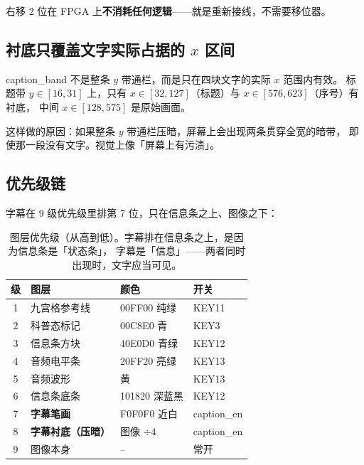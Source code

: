 \documentclass[10pt,a4paper]{article}
\newcommand{\sig}[1]{{\ttfamily\small #1}}
\newcommand{\code}[1]{{\ttfamily\small #1}}
\begin{document}
右移 2 位在 FPGA 上\textbf{不消耗任何逻辑}——就是重新接线，不需要移位器。

\subsection{\texorpdfstring{衬底只覆盖文字实际占据的 $x$ 区间}{衬底只覆盖文字实际占据的 x 区间}}

\code{caption\_band} 不是整条 $y$ 带通栏，而是只在四块文字的实际 $x$ 范围内有效。
标题带 $y\in[16,31]$ 上，只有 $x\in[32,127]$（标题）与 $x\in[576,623]$（序号）有衬底，
中间 $x\in[128,575]$ 是原始画面。

这样做的原因：如果整条 $y$ 带通栏压暗，屏幕上会出现两条贯穿全宽的暗带，
即使那一段没有文字。视觉上像「屏幕上有污渍」。

\subsection{优先级链}

字幕在 9 级优先级里排第 7 位，只在信息条之上、图像之下：

\begin{table}[htbp]
\centering\small
\caption{图层优先级（从高到低）。字幕排在信息条之上，是因为信息条是「状态条」，
字幕是「信息」——两者同时出现时，文字应当可见。}
\label{tab:priority}
\renewcommand{\arraystretch}{1.2}
\begin{tabular}{@{}c l l l@{}}
\toprule
\textbf{级} & \textbf{图层} & \textbf{颜色} & \textbf{开关}\\
\midrule
1 & 九宫格参考线 & \code{00FF00} 纯绿 & KEY11\\
2 & 科普态标记 & \code{00C8E0} 青 & KEY3\\
3 & 信息条方块 & \code{40E0D0} 青绿 & KEY12\\
4 & 音频电平条 & \code{20FF20} 亮绿 & KEY13\\
5 & 音频波形 & 黄 & KEY13\\
6 & 信息条底条 & \code{101820} 深蓝黑 & KEY12\\
\rowcolor{dsaccent!8}
7 & \textbf{字幕笔画} & \code{F0F0F0} 近白 & \sig{caption\_en}\\
\rowcolor{dsaccent!4}
8 & \textbf{字幕衬底（压暗）} & 图像 $\div 4$ & \sig{caption\_en}\\
9 & 图像本身 & -- & 常开\\
\bottomrule
\end{tabular}
\end{table}

\end{document}
